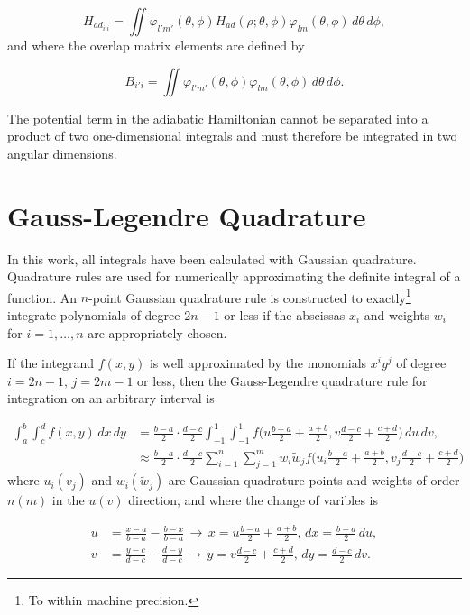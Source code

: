 \begin{equation}\label{ham_mat}
H_{ad_{i'i}} = \iint \varphi_{l'm'}(\theta,\phi) H_{ad}(\rho;\theta,\phi)\varphi_{lm}(\theta,\phi) \,d\theta\,d\phi,
\end{equation}
and where the overlap matrix elements are defined by

\begin{equation}\label{over_mat}
B_{i'i} = \iint \varphi_{l'm'}(\theta,\phi)\varphi_{lm}(\theta,\phi)\,d\theta\,d\phi.
\end{equation}

The potential term in the adiabatic Hamiltonian cannot be separated into a product of two one-dimensional integrals and must therefore be integrated in two angular dimensions. 

\section{Gauss-Legendre Quadrature}
In this work, all integrals have been calculated with Gaussian quadrature. Quadrature rules are used for numerically approximating the definite integral of a function. An $n$-point Gaussian quadrature rule is constructed to exactly\footnote{To within machine precision.} integrate polynomials of degree $2n-1$ or less if the abscissas $x_i$ and weights $w_i$ for $i=1,\ldots,n$ are appropriately chosen. 

If the integrand $f(x,y)$ is well approximated by the monomials $x^{i}y^{j}$ of degree $i = 2n-1, \, j = 2m-1$ or less, then the Gauss-Legendre quadrature rule for integration on an arbitrary interval is 

\begin{equation}
\begin{aligned}
\int_{a}^{b} \int_{c}^{d}f(x,y) \,dx\,dy &= \frac{b-a}{2} \cdot \frac{d-c}{2} \int_{-1}^{1} \int_{-1}^{1}f \bigg( u\frac{b-a}{2} + \frac{a+b}{2},v\frac{d-c}{2} + \frac{c+d}{2} \bigg) \,du\,dv,\\
&\approx \frac{b-a}{2} \cdot \frac{d-c}{2} \sum_{i=1}^{n}\sum_{j=1}^{m}w_i \tilde{w}_j f\bigg( u_i\frac{b-a}{2} + \frac{a+b}{2},v_j\frac{d-c}{2} + \frac{c+d}{2}\bigg)
\end{aligned}
\end{equation}
where $u_i (v_j)$ and $w_i (\tilde{w}_j)$ are Gaussian quadrature points and weights of order $n (m)$ in the $u (v)$ direction, and where the change of varibles is

\begin{equation}
\begin{aligned}
u &= \frac{x-a}{b-a} - \frac{b-x}{b-a} \, \rightarrow \, x= u\frac{b-a}{2}+\frac{a+b}{2}, \,dx=\frac{b-a}{2}\,du, \\
v &= \frac{y-c}{d-c} - \frac{d-y}{d-c} \, \rightarrow \, y= v\frac{d-c}{2}+\frac{c+d}{2}, \,dy=\frac{d-c}{2}\,dv.
\end{aligned}
\end{equation} 


